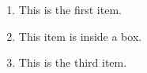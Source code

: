 \documentclass{beamer}
\begin{document}
\begin{frame}
  \begin{enumerate}
    \item This is the first item.
    \item \begin{tcolorbox}[mybox]
            This item is inside a box.
          \end{tcolorbox}
    \item This is the third item.
  \end{enumerate}
\end{frame}
\end{document}
